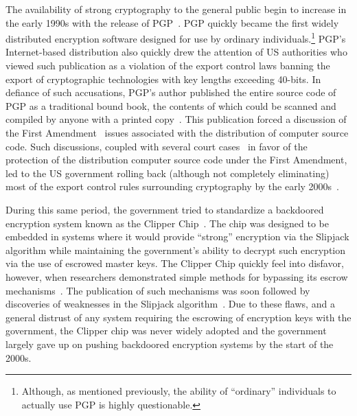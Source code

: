 The availability of strong cryptography to the general public begin to
increase in the early 1990s with the release of
PGP~\cite{zimmermann-pgp10}. PGP quickly became the first widely
distributed encryption software designed for use by ordinary
individuals.\footnote{Although, as mentioned previously, the ability
  of ``ordinary'' individuals to actually use PGP is highly
  questionable\cite{whitten1999}.}  PGP's Internet-based distribution
also quickly drew the attention of US authorities who viewed such
publication as a violation of the export control laws banning the
export of cryptographic technologies with key lengths exceeding
40-bits. In defiance of such accusations, PGP's author published the
entire source code of PGP as a traditional bound book, the contents of
which could be scanned and compiled by anyone with a printed
copy~\cite{zimmermann-pgpsource}. This publication forced a discussion
of the First Amendment~\cite{us-constitution-amend1} issues associated
with the distribution of computer source code. Such discussions,
coupled with several court cases~\cite{ninthcir-bernstein,
  sixthcir-junger} in favor of the protection of the distribution
computer source code under the First Amendment, led to the US
government rolling back (although not completely eliminating) most of
the export control rules surrounding cryptography by the early
2000s~\cite{kehl2015}.

During this same period, the government tried to standardize a
backdoored encryption system known as the Clipper
Chip~\cite{whitehouse-clipper}. The chip was designed to be embedded
in systems where it would provide ``strong'' encryption via the
Slipjack algorithm while maintaining the government's ability to
decrypt such encryption via the use of escrowed master keys. The
Clipper Chip quickly feel into disfavor, however, when researchers
demonstrated simple methods for bypassing its escrow
mechanisms~\cite{blaze1994}. The publication of such mechanisms was
soon followed by discoveries of weaknesses in the Slipjack
algorithm~\cite{biham1998}. Due to these flaws, and a general distrust
of any system requiring the escrowing of encryption keys with the
government, the Clipper chip was never widely adopted and the
government largely gave up on pushing backdoored encryption systems by
the start of the 2000s.

